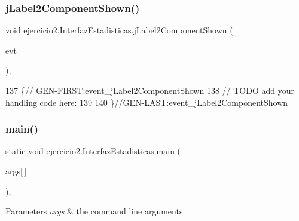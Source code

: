 \subsubsection{\texorpdfstring{j\+Label2\+Component\+Shown()}{jLabel2ComponentShown()}}
{\footnotesize\ttfamily void ejercicio2.\+Interfaz\+Estadisticas.\+j\+Label2\+Component\+Shown (\begin{DoxyParamCaption}\item[{java.\+awt.\+event.\+Component\+Event}]{evt }\end{DoxyParamCaption})\hspace{0.3cm}{\ttfamily [inline]}, {\ttfamily [private]}}


\begin{DoxyCode}
137                                                                           \{\textcolor{comment}{//
      GEN-FIRST:event\_jLabel2ComponentShown}
138         \textcolor{comment}{// TODO add your handling code here:}
139         
140     \}\textcolor{comment}{//GEN-LAST:event\_jLabel2ComponentShown}
\end{DoxyCode}
\mbox{\label{classejercicio2_1_1_interfaz_estadisticas_ae9fe09afc5dec107cc367f1f90ba25b6}} 
\subsubsection{\texorpdfstring{main()}{main()}}
{\footnotesize\ttfamily static void ejercicio2.\+Interfaz\+Estadisticas.\+main (\begin{DoxyParamCaption}\item[{String}]{args\mbox{[}$\,$\mbox{]} }\end{DoxyParamCaption})\hspace{0.3cm}{\ttfamily [inline]}, {\ttfamily [static]}}


\begin{DoxyParams}{Parameters}
{\em args} & the command line arguments \\
\hline
\end{DoxyParams}

